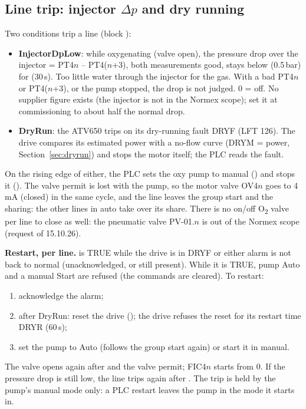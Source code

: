 \documentclass[11pt,a4paper]{article}
\newcommand{\Otwo}{O\textsubscript{2}}
\begin{document}
\subsection{Line trip: injector \texorpdfstring{$\Delta p$}{dp} and dry running}
\label{sec:trip}
Two conditions trip a line (block ):
\begin{itemize}[nosep]
  \item \textbf{InjectorDpLow}: while oxygenating (valve open), the pressure drop over the injector
         = PT4$n$ -- PT4($n$+3), both measurements good, stays below
         (0.5\,bar) for  (30\,s). Too little water through
        the injector for the gas. With a bad PT4$n$ or PT4($n$+3), or the pump stopped, the drop is
        not judged. 0 = off. No supplier figure exists (the injector is not in the Normex scope); set
        it at commissioning to about half the normal drop.
  \item \textbf{DryRun}: the ATV650 trips on its dry-running fault DRYF (LFT 126). The drive
        compares its estimated power with a no-flow curve (DRYM = power, Section~\ref{sec:dryrun}) and
        stops the motor itself; the PLC reads the fault.
\end{itemize}
On the rising edge of either, the PLC sets the oxy pump to manual () and
stops it (). The valve permit is lost with the pump, so the motor valve
OV4$n$ goes to 4\,mA (closed) in the same cycle, and the line leaves the group start and the sharing:
the other lines in auto take over its share. There is no on/off \Otwo{} valve per line to close
as well: the pneumatic valve PV-01.$n$ is out of the Normex scope (request of 15.10.26).

\textbf{Restart, per line.}  is TRUE while the drive is in DRYF or either
alarm is not back to normal (unacknowledged, or still present). While it is TRUE, pump Auto and
a manual Start are refused (the commands are cleared). To restart:
\begin{enumerate}[nosep]
  \item acknowledge the alarm;
  \item after DryRun: reset the drive (); the drive refuses the reset for
        its restart time DRYR (60\,s);
  \item set the pump to Auto (follows the group start again) or start it in manual.
\end{enumerate}
The valve opens again after  and the valve permit; FIC4$n$ starts from 0. If the
pressure drop is still low, the line trips again after . The trip is held by
the pump's manual mode only: a PLC restart leaves the pump in the mode it starts in.
\end{document}
